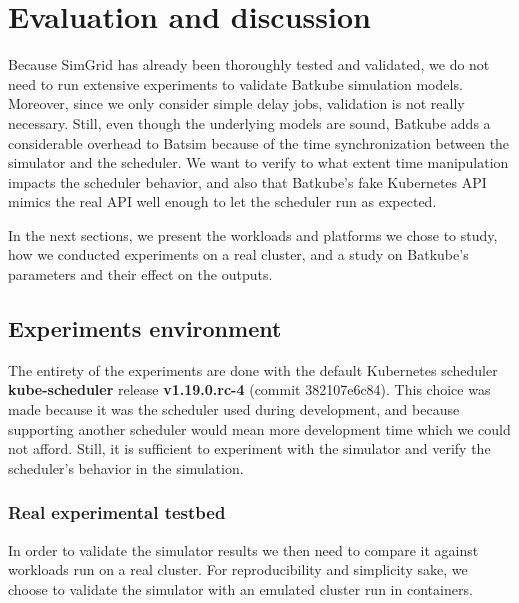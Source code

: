 \chapter{Evaluation and discussion}

Because SimGrid has already been thoroughly tested and validated, we do not
need to run extensive experiments to validate Batkube simulation models.
Moreover, since we only consider simple delay jobs, validation is not really
necessary. Still, even though the underlying models are sound, Batkube adds a
considerable overhead to Batsim because of the time synchronization between the
simulator and the scheduler. We want to verify to what extent time manipulation
impacts the scheduler behavior, and also that Batkube's fake Kubernetes API
mimics the real API well enough to let the scheduler run as expected.

In the next sections, we present the workloads and platforms we chose to study,
how we conducted experiments on a real cluster, and a study on Batkube's
parameters and their effect on the outputs.

\section{Experiments environment}

The entirety of the experiments are done with the default Kubernetes scheduler
\textbf{kube-scheduler} release \textbf{v1.19.0.rc-4} (commit 382107e6c84).
This choice was made because it was the scheduler used during development, and
because supporting another scheduler would mean more development time which we
could not afford. Still, it is sufficient to experiment with the simulator and
verify the scheduler's behavior in the simulation.

\subsection{Real experimental testbed}

In order to validate the simulator results we then need to compare it against
workloads run on a real cluster. For reproducibility and simplicity sake, we
choose to validate the simulator with an emulated cluster run in
containers.\\

